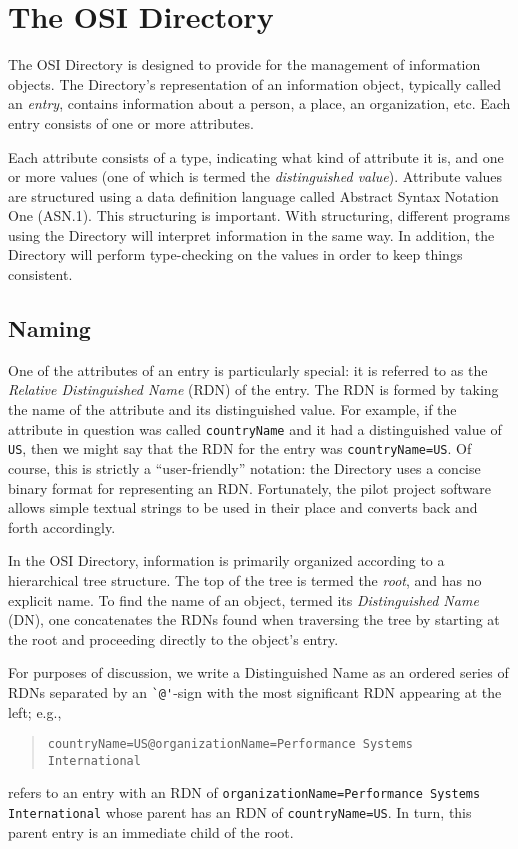 
\section	{The OSI Directory}
The OSI Directory is designed to provide
for the management of information objects.
The Directory's representation of an information object,
typically called an {\em entry},
contains information about a person, a place, an organization, etc.
Each entry consists of one or more attributes.

Each attribute consists of a type,
indicating what kind of attribute it is,
and one or more values
(one of which is termed the {\em distinguished value\/}).
Attribute values are structured using a data definition language
called Abstract Syntax Notation One (ASN.1).
This structuring is important.
With structuring,
different programs using the Directory will interpret information in the same
way.
In addition,
the Directory will perform type-checking on the values in order
to keep things consistent.

\subsection	{Naming}
One of the attributes of an entry is particularly special:
it is referred to as the {\em Relative Distinguished Name\/} (RDN) of
the entry.
The RDN is formed by taking the name of the attribute and its
distinguished value.
For example,
if the attribute in question was called \verb"countryName" and it had
a distinguished value of \verb"US", then we might say that the RDN
for the entry was \verb"countryName=US".
Of course,
this is strictly a ``user-friendly'' notation:
the Directory uses a concise binary format for representing an RDN.
Fortunately,
the pilot project software allows simple textual strings to be used in their
place and converts back and forth accordingly.

In the OSI Directory,
information is primarily organized according to a hierarchical tree
structure.
The top of the tree is termed the {\em root},
and has no explicit name.
To find the name of an object,
termed its {\em Distinguished Name\/} (DN),
one concatenates the RDNs found when traversing the tree by starting
at the root and proceeding directly to the object's entry.

For purposes of discussion,
we write a Distinguished Name as an ordered series of RDNs separated by
an \verb"`@'"-sign with the most significant RDN appearing at the left;
e.g.,
\begin{quote}\small\begin{verbatim}
countryName=US@organizationName=Performance Systems International
\end{verbatim}\end{quote}
refers to an entry with an RDN of
\verb"organizationName=Performance Systems International"
whose parent has an RDN of \verb"countryName=US".
In turn,
this parent entry is an immediate child of the root.

